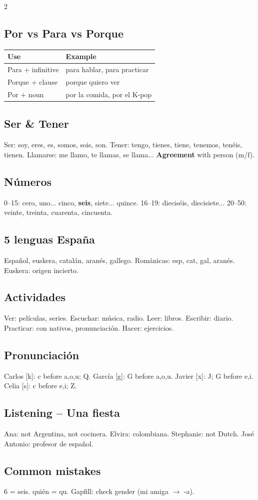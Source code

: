 \documentclass[10pt,landscape,a4paper]{article}
\begin{document}
\begin{multicols}{2}
\subsection*{\color{accent} Por vs Para vs Porque}
\begin{center}
\small
\begin{tabular}{@{}ll@{}}
\toprule
\textbf{Use} & \textbf{Example} \\
\midrule
Para + infinitive & para hablar, para practicar \\
Porque + clause & porque quiero ver \\
Por + noun & por la comida, por el K-pop \\
\bottomrule
\end{tabular}
\end{center}

\subsection*{\color{accent} Ser \& Tener}
Ser: soy, eres, es, somos, sois, son. Tener: tengo, tienes, tiene, tenemos, ten\'eis, tienen. Llamarse: me llamo, te llamas, se llama... \textbf{Agreement} with person (m/f).

\subsection*{\color{accent} N\'umeros}
0--15: cero, uno... cinco, \textbf{seis}, siete... quince. 16--19: diecis\'eis, diecisiete... 20--50: veinte, treinta, cuarenta, cincuenta.

\subsection*{\color{accent} 5 lenguas Espa\~na}
Espa\~nol, euskera, catal\'an, aran\'es, gallego. Rom\'anicas: esp, cat, gal, aran\'es. Euskera: origen incierto.

\subsection*{\color{accent} Actividades}
Ver: pel\'iculas, series. Escuchar: m\'usica, radio. Leer: libros. Escribir: diario. Practicar: con nativos, pronunciaci\'on. Hacer: ejercicios.

\subsection*{\color{accent} Pronunciaci\'on}
Carlos [k]: c before a,o,u; Q. Garc\'ia [g]: G before a,o,u. Javier [x]: J; G before e,i. Celia [s]: c before e,i; Z.

\subsection*{\color{accent} Listening -- Una fiesta}
Ana: not Argentina, not cocinera. Elvira: colombiana. Stephanie: not Dutch. Jos\'e Antonio: profesor de espa\~nol.

\subsection*{\color{accent} Common mistakes}
6 = seis. qui\'en = qu. Gapfill: check gender (mi amiga $\to$ -a).

\end{multicols}
\end{document}
